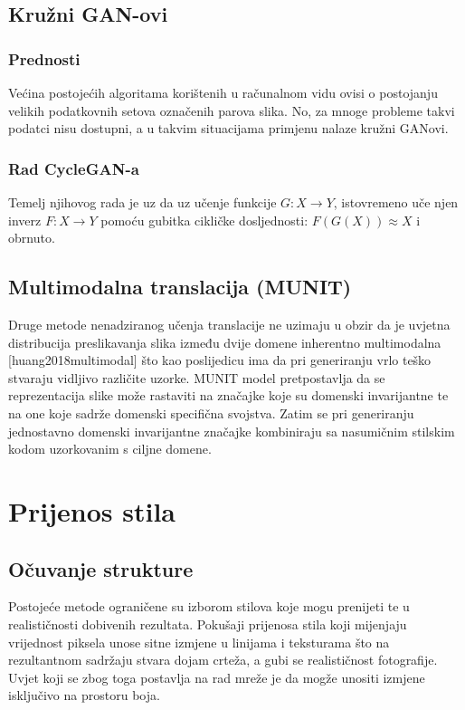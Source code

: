 \documentclass[lmodern, utf8, seminar]{fer}
\begin{document}
\section{Kružni GAN-ovi}

\subsection{Prednosti}
Većina postojećih algoritama korištenih u računalnom vidu ovisi o postojanju velikih podatkovnih setova označenih parova slika. No, za mnoge probleme takvi podatci nisu dostupni, a u takvim situacijama primjenu nalaze kružni GANovi.
\newline

\subsection{Rad CycleGAN-a}
Temelj njihovog rada je uz da uz učenje funkcije $G: X \rightarrow Y$, istovremeno uče njen inverz $F: X \rightarrow Y$ pomoću gubitka cikličke dosljednosti: $F(G(X)) \approx X$ i obrnuto.

\section{Multimodalna translacija (MUNIT)}
Druge metode nenadziranog učenja translacije ne uzimaju u obzir da je uvjetna distribucija preslikavanja slika između dvije domene inherentno multimodalna [huang2018multimodal] što kao poslijedicu ima da pri generiranju vrlo teško stvaraju vidljivo različite uzorke. MUNIT model pretpostavlja da se reprezentacija slike može rastaviti na značajke koje su domenski invarijantne te na one koje sadrže domenski specifična svojstva. Zatim se pri generiranju jednostavno domenski invarijantne značajke kombiniraju sa nasumičnim stilskim kodom uzorkovanim s ciljne domene.


\chapter{Prijenos stila}
\section{Očuvanje strukture}
Postojeće metode ograničene su izborom stilova koje mogu prenijeti te u realističnosti dobivenih rezultata. Pokušaji prijenosa stila koji mijenjaju vrijednost piksela unose sitne izmjene u linijama i teksturama što na rezultantnom sadržaju stvara dojam crteža, a gubi se realističnost fotografije. Uvjet koji se zbog toga postavlja na rad mreže je da mogže unositi izmjene isključivo na prostoru boja.
\end{document}

